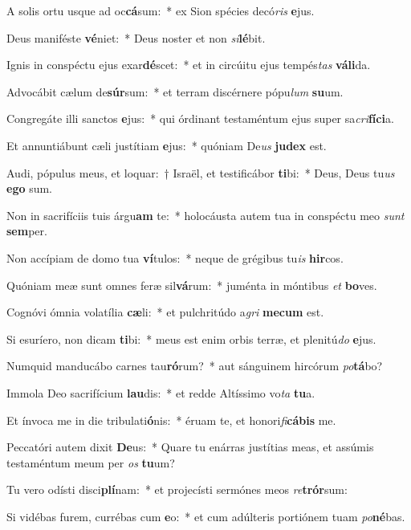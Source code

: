 \item A solis ortu usque ad oc\textbf{cá}sum:~* ex Sion spécies decó\textit{ris} \textbf{e}jus.
\item Deus maniféste \textbf{vé}niet:~* Deus noster et non \textit{si}\textbf{lé}bit.
\item Ignis in conspéctu ejus exar\textbf{dé}scet:~* et in circúitu ejus tempés\textit{tas} \textbf{vá}\textbf{li}da.
\item Advocábit cælum de\textbf{súr}sum:~* et terram discérnere pópu\textit{lum} \textbf{su}um.
\item Congregáte illi sanctos \textbf{e}jus:~* qui órdinant testaméntum ejus super sa\textit{cri}\textbf{fí}\textbf{ci}a.
\item Et annuntiábunt cæli justítiam \textbf{e}jus:~* quóniam De\textit{us} \textbf{ju}\textbf{dex} est.
\item Audi, pópulus meus, et loquar:~† Israël, et testificábor \textbf{ti}bi:~* Deus, Deus tu\textit{us} \textbf{e}\textbf{go} sum.
\item Non in sacrifíciis tuis árgu\textbf{am} te:~* holocáusta autem tua in conspéctu meo \textit{sunt} \textbf{sem}per.
\item Non accípiam de domo tua \textbf{ví}tulos:~* neque de grégibus tu\textit{is} \textbf{hir}cos.
\item Quóniam meæ sunt omnes feræ sil\textbf{vá}rum:~* juménta in móntibus \textit{et} \textbf{bo}ves.
\item Cognóvi ómnia volatília \textbf{cæ}li:~* et pulchritúdo a\textit{gri} \textbf{me}\textbf{cum} est.
\item Si esuríero, non dicam \textbf{ti}bi:~* meus est enim orbis terræ, et plenitú\textit{do} \textbf{e}jus.
\item Numquid manducábo carnes tau\textbf{ró}rum?~* aut sánguinem hircórum \textit{po}\textbf{tá}bo?
\item Immola Deo sacrifícium \textbf{lau}dis:~* et redde Altíssimo vo\textit{ta} \textbf{tu}a.
\item Et ínvoca me in die tribulati\textbf{ó}nis:~* éruam te, et honori\textit{fi}\textbf{cá}\textbf{bis} me.
\item Peccatóri autem dixit \textbf{De}us:~* Quare tu enárras justítias meas, et assúmis testaméntum meum per \textit{os} \textbf{tu}um?
\item Tu vero odísti disci\textbf{plí}nam:~* et projecísti sermónes meos \textit{re}\textbf{trór}sum:
\item Si vidébas furem, currébas cum \textbf{e}o:~* et cum adúlteris portiónem tuam \textit{po}\textbf{né}bas.
